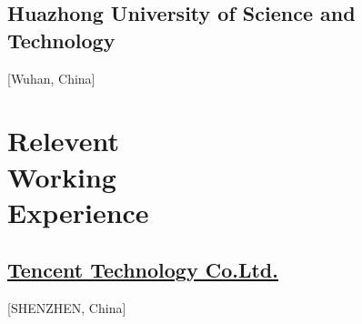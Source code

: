 \documentclass{mycv}
\begin{document}
\subsection{Huazhong University of Science and Technology}[Wuhan, China]
\begin{positions}
\end{positions}
\vspace{-\parskip}%

\section{Relevent \\ Working \\ Experience}




\subsection{\href{https://www.tencent.com/en-us}{Tencent Technology Co.Ltd.}}[SHENZHEN, China]
\begin{positions}
\end{positions}

\end{document}
